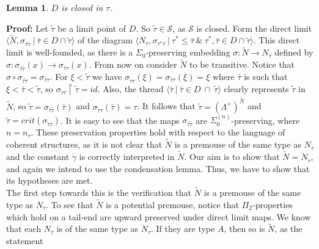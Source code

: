 \documentclass[12pt]{article}
\newtheorem{lem}[thm]{Lemma}
\begin{document}
\begin{lem} \label{S-0 D closed}
$D$ is closed in $\tau$.
\end{lem}

\textbf{Proof:}  Let $\tilde{\tau}$ be a limit point of $D$.  So $\tilde{\tau} \in \mathcal{S}$, as $\mathcal{S}$ is closed.  Form the direct limit $\langle \tilde{N} , \sigma_{\bar{\tau} \tilde{\tau} } \ | \ \bar{\tau} \in D \cap \tilde{\tau} \rangle$ of the diagram $\langle N_{\bar{\tau}} , \sigma_{ \tau^* \bar{\tau}} \ | \ \tau^* \leq \bar{\tau} \ \& \ \tau^* , \bar{\tau} \in D \cap \tilde{\tau} \rangle$.  This direct limit is well-founded, as there is a $\Sigma_0$-preserving embedding $\sigma : \tilde{N} \longrightarrow N_\tau$ defined by $\sigma : \sigma_{\bar{\tau} \tilde{\tau}} (x) \longrightarrow \sigma_{\bar{\tau} \tau} (x)$.  From now on consider $\tilde{N}$ to be transitive.  Notice that $\sigma \circ \sigma_{\bar{\tau} \tilde{\tau}} = \sigma_{\bar{\tau} \tau}$.  For $\xi < \tilde{\tau}$ we have $\sigma_{ \tilde{\tau} \tau} (\xi) = \sigma_{ \bar{\tau} \tau} (\xi) = \xi$ where $\bar{\tau}$ is such that $\xi < \bar{\tau} < \tilde{\tau}$, so $\sigma_{ \tilde{\tau} \tau} \restriction \tilde{\tau} = id$.  Also, the thread $\langle \bar{\tau} \ | \ \bar{\tau} \in D \ \cap \ \tilde{\tau} \rangle$ clearly represents $\tilde{\tau}$ in $\tilde{N}$, so $\tilde{\tau} = \sigma_{ \bar{\tau} \tilde{\tau} } (\bar{\tau})$ and $\sigma_{ \tilde{\tau} \tau} (\bar{\tau}) = \tau$.  It follows that $\tilde{\tau} = (\Lambda^+)^{\tilde{N}}$ and $\tilde{\tau} = crit(\sigma_{ \tilde{\tau} \tau})$.  It is easy to see that the maps $\sigma_{ \bar{\tau} \tilde{\tau} }$ are $\Sigma_0^{(n)}$-preserving, where $n = n_\tau$.  These preservation properties hold with respect to the language of coherent structures, as it is not clear that $\tilde{N}$ is a premouse of the same type as $N_\tau$ and the constant $\dot{\gamma}$ is correctly interpreted in $\tilde{N}$.  Our aim is to show that $\tilde{N} = N_{\tilde{\tau}}$, and again we intend to use the condensation lemma.  Thus, we have to show that its hypotheses are met.\\

The first step towards this is the verification that $\tilde{N}$ is a premouse of the same type as $N_\tau$.  To see that $\tilde{N}$ is a potential premouse, notice that $\Pi_2$-properties which hold on a tail-end are upward preserved under direct limit maps.  We know that each $N_{\bar{\tau}}$ is of the same type as $N_\tau$.  If they are type $A$, then so is $\tilde{N}$, as the statement 
\end{document}
